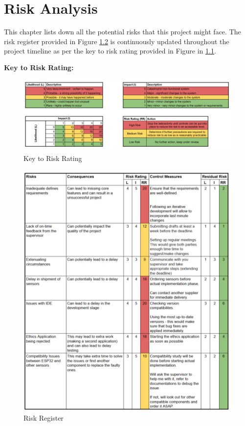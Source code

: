 \chapter{Risk Analysis}

This chapter lists down all the potential risks that this project might face. The risk register provided in Figure \ref{fig:rr} is continuously updated throughout the project timeline as per the key to risk rating provided in Figure in \ref{fig:ktrr}.

\vspace{5.5cm}
\noindent\textbf{Key to Risk Rating:}
\begin{figure}
    \centering
    \includegraphics[width=1\linewidth]{images/ktrr.png}
    \caption{Key to Risk Rating}
    \label{fig:ktrr}
\end{figure}

\begin{figure}
    \centering
    \includegraphics[width=1\linewidth]{images/rr.png}
    \caption{Risk Register}
    \label{fig:rr}
\end{figure}